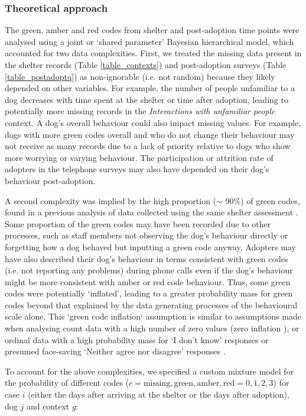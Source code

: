 \documentclass[fleqn,10pt]{wlscirep}
\begin{document}
\subsubsection*{Theoretical approach}\label{sec_theoretical_approach}
The green, amber and red codes from shelter and post-adoption time points were analysed using a joint or `shared parameter' \cite{vonesh2006,tseng2016} Bayesian hierarchical model, which accounted for two data complexities. First, we treated the missing data present in the shelter records (Table \ref{table_contexts}) and post-adoption surveys (Table \ref{table_postadoptq}) as non-ignorable (i.e. not random) because they likely depended on other variables. For example, the number of people unfamiliar to a dog decreases with time spent at the shelter or time after adoption, leading to potentially more missing records in the \textit{Interactions with unfamiliar people} context. A dog’s overall behaviour could also impact missing values. For example, dogs with more green codes overall and who do not change their behaviour may not receive as many records due to a lack of priority relative to dogs who show more worrying or varying behaviour. The participation or attrition rate of adopters in the telephone surveys may also have depended on their dog’s behaviour post-adoption.

A second complexity was implied by the high proportion ($\sim$ 90\%) of green codes, found in a previous analysis of data collected using the same shelter assessment \cite{goold2017modelling}. Some proportion of the green codes may have been recorded due to other processes, such as staff members not observing the dog’s behaviour directly or forgetting how a dog behaved but inputting a green code anyway. Adopters may have also described their dog’s behaviour in terms consistent with green codes (i.e. not reporting any problems) during phone calls even if the dog’s behaviour might be more consistent with amber or red code behaviour. Thus, some green codes were potentially ‘inflated’, leading to a greater probability mass for green codes beyond that explained by the data generating processes of the behavioural scale alone. This `green code inflation` assumption is similar to assumptions made when analysing count data with a high number of zero values (zero inflation \cite{lambert1992}), or ordinal data with a high probability mass for ‘I don’t know’ responses \cite{kelley2008} or presumed face-saving ‘Neither agree nor disagree’ responses \cite{bagozzi2012}.

To account for the above complexities, we specified a custom mixture model for the probability of different codes ($c = {\text{missing}, \text{green}, \text{amber}, \text{red}} = {0, 1, 2, 3}$) for case $i$ (either the days after arriving at the shelter or the days after adoption), dog $j$ and context $g$:
\end{document}

